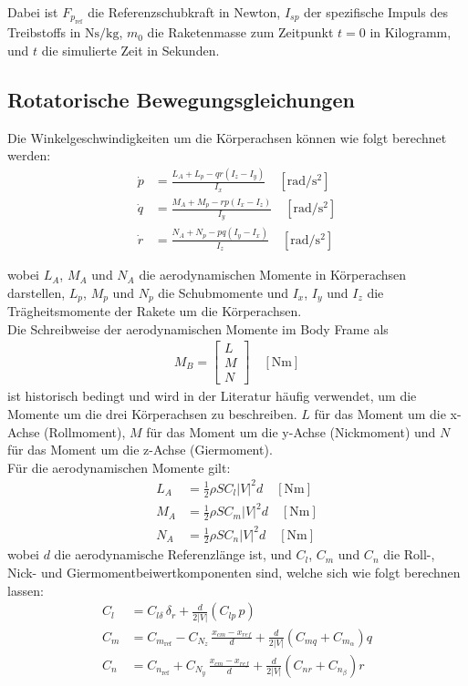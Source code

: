Dabei ist $F_{p_{\mathrm{ref}}}$ die Referenzschubkraft in Newton,
$I_{sp}$ der spezifische Impuls des Treibstoffs in $\mathrm{Ns/kg}$,
$m_0$ die Raketenmasse zum Zeitpunkt $t = 0$ in Kilogramm,
und $t$ die simulierte Zeit in Sekunden.


\subsection{Rotatorische Bewegungsgleichungen}
\label{subsec:rotatorische_bewegungsgleichungen}
Die Winkelgeschwindigkeiten um die Körperachsen können wie folgt berechnet werden:
\begin{align*}
\dot{p} &= \frac{L_A + L_p - q r \left(I_z - I_y\right)}{I_x}
\quad \left[\mathrm{rad/s^2}\right] \\[6pt]
\dot{q} &= \frac{M_A + M_p - r p \left(I_x - I_z\right)}{I_y}
\quad \left[\mathrm{rad/s^2}\right] \\[6pt]
\dot{r} &= \frac{N_A + N_p - p q \left(I_y - I_x\right)}{I_z}
\quad \left[\mathrm{rad/s^2}\right]
\end{align*}

wobei $L_A$, $M_A$ und $N_A$ die aerodynamischen Momente in Körperachsen darstellen, $L_p$, $M_p$ und $N_p$ die Schubmomente und $I_x$, $I_y$ und $I_z$ die Trägheitsmomente der Rakete um die Körperachsen.
\\
Die Schreibweise der aerodynamischen Momente im Body Frame als 
\begin{align}
M_B = \begin{bmatrix}
    L \\
    M \\
    N   
    \end{bmatrix}
    \quad \left[\mathrm{Nm}\right] 
\end{align} 
ist historisch bedingt und wird in der Literatur häufig verwendet, um die Momente um die drei Körperachsen zu beschreiben. $L$ für das Moment um die x-Achse (Rollmoment), $M$ für das Moment um die y-Achse (Nickmoment) und $N$ für das Moment um die z-Achse (Giermoment).   
\\
Für die aerodynamischen Momente gilt:
\begin{align}
L_A &= \frac{1}{2} \rho S C_{l} |V|^2 d \quad \left[\mathrm{Nm}\right] \\
M_A &= \frac{1}{2} \rho S C_{m} |V|^2 d \quad \left[\mathrm{Nm}\right] \\
N_A &= \frac{1}{2} \rho S C_{n} |V|^2 d \quad \left[\mathrm{Nm}\right]
\end{align}
wobei $d$ die aerodynamische Referenzlänge ist, und $C_{l}$, $C_{m}$ und $C_{n}$ die Roll-, Nick- und Giermomentbeiwertkomponenten sind, welche sich wie folgt berechnen lassen:
\begin{align}
C_l &= C_{l\delta}\,\delta_r 
      + \frac{d}{2 |V|}\left(C_{lp}\, p \right) \\
C_m &= C_{m_{\mathrm{ref}}} 
      - C_{N_z}\,\frac{x_{cm} - x_{ref}}{d} 
      + \frac{d}{2 |V|}\left(C_{mq} + C_{m_\alpha}\right) q \\
C_n &= C_{n_{\mathrm{ref}}} 
      + C_{N_y}\,\frac{x_{cm} - x_{ref}}{d} 
      + \frac{d}{2 |V|}\left(C_{nr} + C_{n_\beta}\right) r
\end{align}

